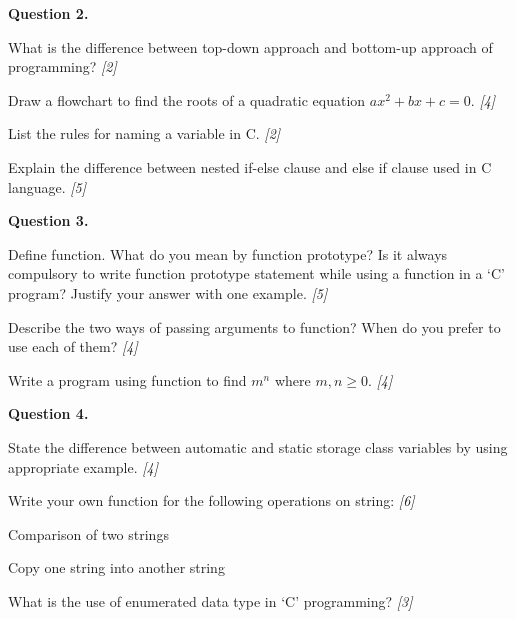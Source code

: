 \documentclass[11pt,a4paper]{article}
\newcommand{\pts}[1]{\hfill   \textit{[#1]}}
\begin{document}
\medskip


\noindent   \textbf{Question 2.}

\begin{parts}
  \item What is the difference between top-down approach and bottom-up approach of programming? \pts{2}
  \item Draw a flowchart to find the roots of a quadratic equation $ax^2 + bx + c = 0$. \pts{4}
  \item List the rules for naming a variable in C. \pts{2}
  \item Explain the difference between nested if-else clause and else if clause used in C language. \pts{5}
\end{parts}

\medskip


\noindent   \textbf{Question 3.}

\begin{parts}
  \item Define function. What do you mean by function prototype? Is it always compulsory to write function prototype statement while using a function in a `C' program? Justify your answer with one example. \pts{5}
  \item Describe the two ways of passing arguments to function? When do you prefer to use each of them? \pts{4}
  \item Write a program using function to find $m^n$ where $m, n \ge 0$. \pts{4}
\end{parts}

\medskip


\noindent   \textbf{Question 4.}

\begin{parts}
  \item State the difference between automatic and static storage class variables by using appropriate example. \pts{4}
  \item Write your own function for the following operations on string: \pts{6}
  
\begin{parts}
    \item Comparison of two strings
    \item Copy one string into another string
  \end{parts}
  \item What is the use of enumerated data type in `C' programming? \pts{3}
\end{parts}

\medskip
\end{document}
